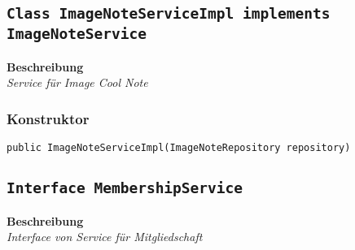     \subsection{\texttt{Class ImageNoteServiceImpl implements ImageNoteService}}
    \textbf{Beschreibung} \\
    \textit{Service für Image Cool Note}
    \subsubsection{Konstruktor}
    \texttt{public ImageNoteServiceImpl(ImageNoteRepository repository)}
    \subsection{\texttt{Interface MembershipService}}
    \textbf{Beschreibung} \\
    \textit{Interface von Service für Mitgliedschaft}

